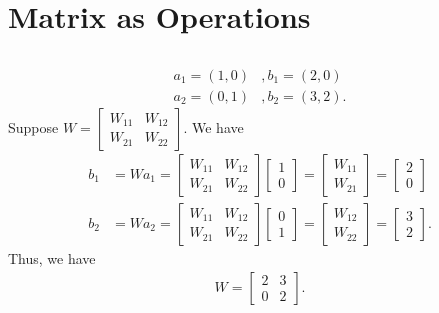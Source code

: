 \documentclass{article}
\begin{document}
\section{Matrix as Operations}\label{sec:Matrix as Operations} %
\subsection{} %
\begin{align*}
    a_1 = (1, 0)&, b_1 = (2, 0)\\
    a_2 = (0, 1)&, b_2 = (3, 2).
\end{align*}
Suppose $ W = \begin{bmatrix}
    W_{11} & W_{12} \\ W_{21} & W_{22}
\end{bmatrix}. $
We have
\begin{align*}
    b_1 &= Wa_1 = \begin{bmatrix}
        W_{11} & W_{12} \\ W_{21} & W_{22}
    \end{bmatrix}\begin{bmatrix}
    1 \\ 0 
    \end{bmatrix}=\begin{bmatrix}
    W_{11} \\ W_{21}
    \end{bmatrix} = \begin{bmatrix}
    2\\0
    \end{bmatrix}\\
    b_2 &= Wa_2 = \begin{bmatrix}
        W_{11 } & W_{12 } \\
        W_{21 } & W_{22}
    \end{bmatrix}\begin{bmatrix}
    0 \\1 
    \end{bmatrix} = \begin{bmatrix}
        W_{12} \\
        W_{22}
    \end{bmatrix} = \begin{bmatrix}
    3  \\ 2 
    \end{bmatrix}.
\end{align*}
Thus, we have
\begin{align*}
    W = \begin{bmatrix}
    2 & 3 \\
    0 & 2
    \end{bmatrix}.
\end{align*}
\end{document}
